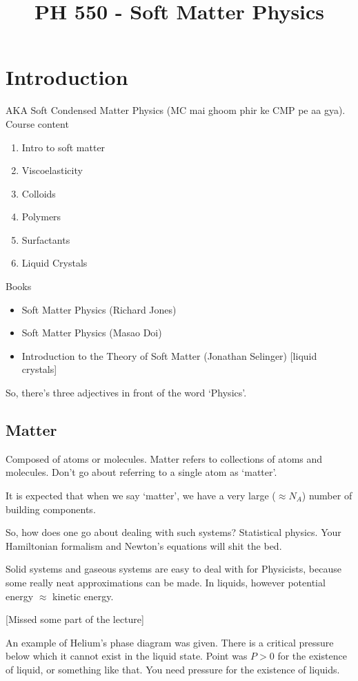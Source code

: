 \documentclass[a4paper]{article}
\title{PH 550 - Soft Matter Physics}
\begin{document}
\section{Introduction}
AKA Soft Condensed Matter Physics (MC mai ghoom phir ke CMP pe aa gya).  Course content
\begin{enumerate}
	\item Intro to soft matter
	\item Viscoelasticity
	\item Colloids
	\item Polymers
	\item Surfactants
	\item Liquid Crystals
\end{enumerate}

Books
\begin{itemize}
	\item Soft Matter Physics (Richard Jones)
	\item Soft Matter Physics (Masao Doi)
	\item Introduction to the Theory of Soft Matter (Jonathan Selinger) [liquid crystals]
\end{itemize}

So, there's three adjectives in front of the word `Physics'.

\subsection{Matter}
Composed of atoms or molecules. Matter refers to collections of atoms
and molecules. Don't go about referring to a single atom as `matter'.

It is expected that when we say `matter', we have a very large ($\approx N_A$) number
of building components. 

So, how does  one go about dealing with such
systems? Statistical physics. Your Hamiltonian formalism and Newton's
equations will shit the bed.

Solid systems and gaseous systems are easy to deal with for Physicists,
because some really neat approximations can be made. In liquids, however
potential energy $\approx$ kinetic energy.

[Missed some part of the lecture]

An example of Helium's phase diagram was given. There is a critical
pressure below which it cannot exist in the liquid state. Point was
$P>0$ for the existence of liquid, or something like that. You need
pressure for  the existence of liquids.
\end{document}
